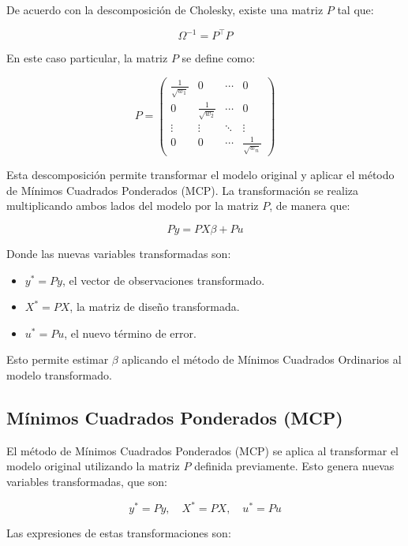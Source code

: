 \documentclass[a4paper,12pt]{article}
\begin{document}
De acuerdo con la descomposición de Cholesky, existe una matriz $P$ tal que:

\[
\Omega^{-1} = P^\top P
\]

En este caso particular, la matriz $P$ se define como:

\[
P =
\begin{pmatrix}
\frac{1}{\sqrt{w_1}} & 0 & \cdots & 0 \\
0 & \frac{1}{\sqrt{w_2}} & \cdots & 0 \\
\vdots & \vdots & \ddots & \vdots \\
0 & 0 & \cdots & \frac{1}{\sqrt{w_n}}
\end{pmatrix}
\]

Esta descomposición permite transformar el modelo original y aplicar el método de Mínimos Cuadrados Ponderados (MCP). La transformación se realiza multiplicando ambos lados del modelo por la matriz $P$, de manera que:

\[
P y = P X \beta + P u
\]

Donde las nuevas variables transformadas son:
\begin{itemize}
    \item $y^* = P y$, el vector de observaciones transformado.
    \item $X^* = P X$, la matriz de diseño transformada.
    \item $u^* = P u$, el nuevo término de error.
\end{itemize}

Esto permite estimar $\beta$ aplicando el método de Mínimos Cuadrados Ordinarios al modelo transformado.



\subsection{Mínimos Cuadrados Ponderados (MCP)}

El método de Mínimos Cuadrados Ponderados (MCP) se aplica al transformar el modelo original utilizando la matriz $P$ definida previamente. Esto genera nuevas variables transformadas, que son:

\[
y^* = P y, \quad X^* = P X, \quad u^* = P u
\]

Las expresiones de estas transformaciones son:
\end{document}
